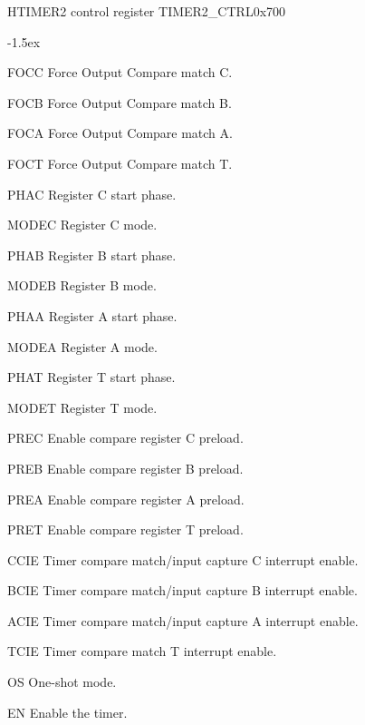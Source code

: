 \documentclass[12pt]{article}
\begin{document}
\begin{register}{H}{TIMER2 control register TIMER2\_CTRL}{0x700}
\label{timer2ctrl}
%
%
%
%
%
%
%
%
%
%
%
%
%
%
%
%
%
%
%
%
%
%
\regnewline%
\end{register}
\begin{regdesc}[0.8\textwidth]\begin{reglist}[000000]
\itemsep-1.5ex
\item [FOCC] Force Output Compare match C.
\item [FOCB] Force Output Compare match B.
\item [FOCA] Force Output Compare match A.
\item [FOCT] Force Output Compare match T.
\item [PHAC] Register C start phase.
\item[MODEC] Register C mode.
\item [PHAB] Register B start phase.
\item[MODEB] Register B mode.
\item [PHAA] Register A start phase.
\item[MODEA] Register A mode.
\item[PHAT] Register T start phase.
\item[MODET] Register T mode.
\item[PREC] Enable compare register C preload.
\item[PREB] Enable compare register B preload.
\item[PREA] Enable compare register A preload.
\item[PRET] Enable compare register T preload.
\item[CCIE] Timer compare match/input capture C interrupt enable.
\item[BCIE] Timer compare match/input capture B interrupt enable.
\item[ACIE] Timer compare match/input capture A interrupt enable.
\item[TCIE] Timer compare match T interrupt enable.
\item[OS] One-shot mode.
\item[EN] Enable the timer.
\end{reglist}\end{regdesc}
\end{document}
